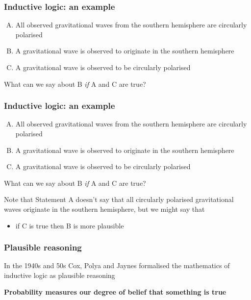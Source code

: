 \begin{frame}

\frametitle{Inductive logic: an example}
\label{inductivelogic:anexample}

\begin{enumerate}[A.]
\item All observed gravitational waves from the southern hemisphere are circularly polarised
\item A gravitational wave is observed to originate in the southern hemisphere
\item A gravitational wave is observed to be circularly polarised
\end{enumerate}

What can we say about B \emph{if} A and C are true?

\end{frame}

\begin{frame}

\frametitle{Inductive logic: an example}
\label{inductivelogic:anexample}


\begin{enumerate}[A.]
\item All observed gravitational waves from the southern hemisphere are circularly polarised
\item A gravitational wave is observed to originate in the southern hemisphere
\item A gravitational wave is observed to be circularly polarised
\end{enumerate}


What can we say about B \emph{if} A and C are true?

Note that Statement A doesn't say that all circularly polarised gravitational waves originate in
the southern hemisphere, but we might say that

\begin{itemize}
\item if C is true then B is more {\color{red} plausible}

\end{itemize}

\end{frame}

\begin{frame}

\frametitle{Plausible reasoning}
\label{plausiblereasoning}

In the 1940s and 50s Cox, Polya and Jaynes formalised the mathematics of inductive logic as
{\color{red} plausible reasoning}

\textbf{Probability measures our degree of belief that something is true}

\end{frame}

